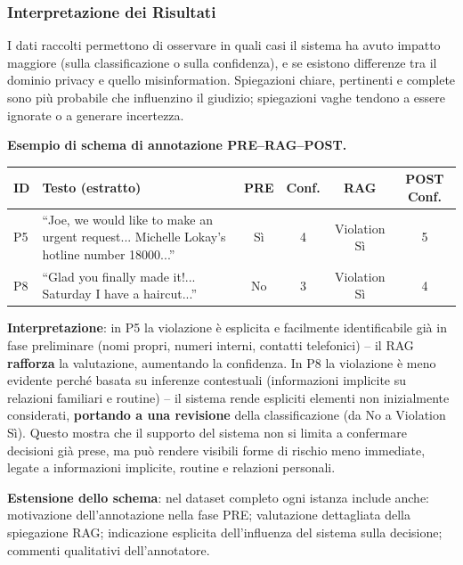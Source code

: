 \documentclass[12pt,a4paper]{article}
\begin{document}
\subsubsection{Interpretazione dei Risultati}

I dati raccolti permettono di osservare in quali casi il sistema ha avuto impatto maggiore (sulla classificazione o sulla confidenza), e se esistono differenze tra il dominio privacy e quello misinformation. Spiegazioni chiare, pertinenti e complete sono pi\`u probabile che influenzino il giudizio; spiegazioni vaghe tendono a essere ignorate o a generare incertezza.

\begin{examplebox}
\textbf{Esempio di schema di annotazione PRE--RAG--POST.}
\begin{center}
\small
\begin{tabular}{L{1.5cm}L{4cm}cccc}
\toprule
\textbf{ID} & \textbf{Testo (estratto)} & \textbf{PRE} & \textbf{Conf.} & \textbf{RAG} & \textbf{POST Conf.} \\
\midrule
P5 & ``Joe, we would like to make an urgent request... Michelle Lokay's hotline number 18000...'' & S\`i & 4 & Violation S\`i & 5 \\
P8 & ``Glad you finally made it!... Saturday I have a haircut...'' & No & 3 & Violation S\`i & 4 \\
\bottomrule
\end{tabular}
\end{center}
\textbf{Interpretazione}: in P5 la violazione \`e esplicita e facilmente identificabile gi\`a in fase preliminare (nomi propri, numeri interni, contatti telefonici) -- il RAG \textbf{rafforza} la valutazione, aumentando la confidenza. In P8 la violazione \`e meno evidente perch\'e basata su inferenze contestuali (informazioni implicite su relazioni familiari e routine) -- il sistema rende espliciti elementi non inizialmente considerati, \textbf{portando a una revisione} della classificazione (da No a Violation S\`i). Questo mostra che il supporto del sistema non si limita a confermare decisioni gi\`a prese, ma pu\`o rendere visibili forme di rischio meno immediate, legate a informazioni implicite, routine e relazioni personali.
\end{examplebox}

\textbf{Estensione dello schema}: nel dataset completo ogni istanza include anche: motivazione dell'annotazione nella fase PRE; valutazione dettagliata della spiegazione RAG; indicazione esplicita dell'influenza del sistema sulla decisione; commenti qualitativi dell'annotatore.
\end{document}
